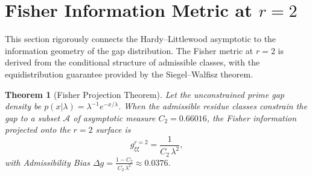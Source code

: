 \documentclass[12pt]{article}
\newtheorem{theorem}{Theorem}[section]
\begin{document}
\section{Fisher Information Metric at $r=2$}

This section rigorously connects the Hardy--Littlewood asymptotic to the
information geometry of the gap distribution. The Fisher metric at $r=2$ is
derived from the conditional structure of admissible classes, with the
equidistribution guarantee provided by the Siegel--Walfisz theorem.

\begin{theorem}[Fisher Projection Theorem]
Let the unconstrained prime gap density be $p(x|\lambda) = \lambda^{-1} e^{-x/\lambda}$.
When the admissible residue classes constrain the gap to a subset $\mathcal{A}$
of asymptotic measure $C_2 = 0.66016$, the Fisher information projected onto
the $r=2$ surface is
\begin{equation}
  g_{\xi\xi}^{r=2} = \frac{1}{C_2\,\lambda^2},
  \label{eq:fisher_r2}
\end{equation}
with Admissibility Bias $\Delta g = \frac{1 - C_2}{C_2\,\lambda^2} \approx 0.0376$.
\end{theorem}
\label{thm:fisher}
\end{document}
